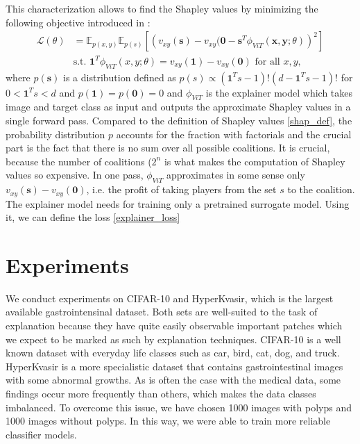 \documentclass[magisterska,en]{pracamgr}
\begin{document}
This characterization allows to find the Shapley values by minimizing the following objective introduced in \cite{DBLP:conf/iclr/JethaniSCLR22}:
\begin{equation}
    \begin{split}
        \mathcal{L}(\theta) &= \mathbb{E}_{p(x,y)} \mathbb{E}_{p(s)}  \left[\left(v_{xy}(\mathbf{s})-v_{xy}(\mathbf{0} -\mathbf{s}^T \phi _{ViT}(\mathbf{x},\mathbf{y};\theta)\right)^2\right] 
        \\
        &    \textrm{s.t.  } \mathbf{1}^T \phi _{ViT}(x,y;\theta) = v_{xy}(\mathbf{1}) - v_{xy}(\mathbf{0}) \textrm{    for all   } x,y,
    \end{split}
\end{equation}\label{explainer_loss}
where $p(\mathbf{s})$ is a distribution defined as $p(s) \propto (\mathbf{1}^Ts - 1)! (d - \mathbf{1}^Ts -1)!$ for $0 < \mathbf{1}^Ts < d$ and $p(\mathbf{1}) = p(\mathbf{0}) = 0$ and $\phi _{ViT}$ is the explainer model which takes image and target class as input and outputs the approximate Shapley values in a single forward pass. Compared to the definition of Shapley values \ref{shap_def}, the probability distribution $p$ accounts for the fraction with factorials and the crucial part is the fact that there is no sum over all possible coalitions. It is crucial, because the number of coalitions ($2^n$ is what makes the computation of Shapley values so expensive. In one pass, $\phi _{ViT}$ approximates in some sense only $v_{xy}(\mathbf{s})-v_{xy}(\mathbf{0})$, i.e. the profit of taking players from the set $s$ to the coalition. The explainer model needs for training only a pretrained surrogate model. Using it, we can define the loss \ref{explainer_loss}




\chapter{Experiments}\label{r:experiments}
We conduct experiments on CIFAR-10 and HyperKvasir, which is the largest available gastrointensinal dataset. Both sets are well-suited to the task of explanation because they have quite easily observable important patches which we expect to be marked as such by explanation techniques. CIFAR-10 is a well known dataset with everyday life classes such as car, bird, cat, dog, and truck.
HyperKvasir is a more specialistic dataset that contains gastrointestinal images with some abnormal growths.
As is often the case with the medical data, some findings occur more frequently than others, which makes the data classes imbalanced. To overcome this issue, we have chosen 1000 images with polyps and 1000 images without polyps. In this way, we were able to train more reliable classifier models.
\end{document}
